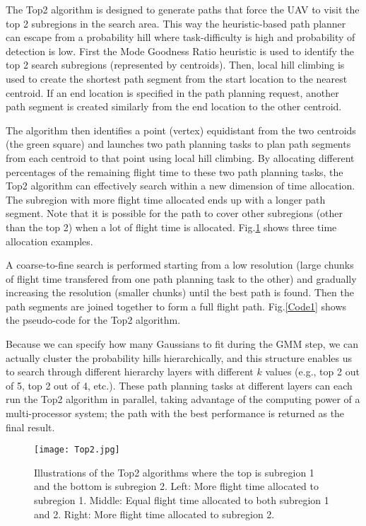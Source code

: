 The Top2 algorithm is designed to generate paths that force the UAV to visit the top 2 subregions in the search area. This way the heuristic-based path planner can escape from a probability hill where task-difficulty is high and probability of detection is low. First the Mode Goodness Ratio heuristic is used to identify the top 2 search subregions (represented by centroids). Then, local hill climbing is used to create the shortest path segment from the start location to the nearest centroid. If an end location is specified in the path planning request, another path segment is created similarly from the end location to the other centroid. 

The algorithm then identifies a point (vertex) equidistant from the two centroids (the green square) and launches two path planning tasks to plan path segments from each centroid to that point using local hill climbing. By allocating different percentages of the remaining flight time to these two path planning tasks, the Top2 algorithm can effectively search within a new dimension of time allocation. The subregion with more flight time allocated ends up with a longer path segment. Note that it is possible for the path to cover other subregions (other than the top 2) when a lot of flight time is allocated. Fig.\ref{Top2} shows three time allocation examples. 

A coarse-to-fine search is performed starting from a low resolution (large chunks of flight time transfered from one path planning task to the other) and gradually increasing the resolution (smaller chunks) until the best path is found. Then the path segments are joined together to form a full flight path. Fig.\ref{Code1} shows the pseudo-code for the Top2 algorithm.

Because we can specify how many Gaussians to fit during the GMM step, we can actually cluster the probability hills hierarchically, and this structure enables us to search through different hierarchy layers with different $k$ values (e.g., top 2 out of 5, top 2 out of 4, etc.). These path planning tasks at different layers can each run the Top2 algorithm in parallel, taking advantage of the computing power of a multi-processor system; the path with the best performance is returned as the final result.
\begin{figure}
\centering
\texttt{[image: Top2.jpg]}
\caption{Illustrations of the Top2 algorithms where the top is subregion 1 and the bottom is subregion 2. Left: More flight time allocated to subregion 1. Middle: Equal flight time allocated to both subregion 1 and 2. Right: More flight time allocated to subregion 2.}
\label{Top2}
\end{figure}

